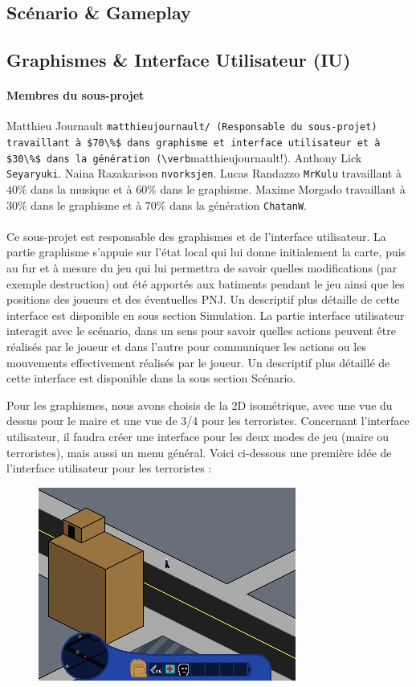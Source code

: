 \documentclass[a4paper,10pt]{article}
\begin{document}
\subsection{Scénario \& Gameplay}
\subsection{Graphismes \& Interface Utilisateur (IU)}
\paragraph{Membres du sous-projet} Matthieu Journault \verb!matthieujournault/ (Responsable du sous-projet) travaillant à $70\%$ dans graphisme et interface utilisateur et à $30\%$ dans la génération (\verb!matthieujournault!). Anthony Lick \verb!Seyaryuki!. Naina Razakarison \verb!nvorksjen!. Lucas Randazzo \verb!MrKulu! travaillant à $40\%$ dans la musique et à $60\%$ dans le graphisme. Maxime Morgado travaillant à  $30\%$ dans le graphisme et à  $70\%$ dans la génération \verb!ChatanW!.
\paragraph{} Ce sous-projet est responsable des graphismes et de l'interface utilisateur. 
La partie graphisme s'appuie sur l'état local qui lui donne initialement la carte, puis au fur et à mesure du jeu qui lui permettra de savoir quelles modifications (par exemple destruction) ont été apportés aux batiments pendant le jeu ainsi que les positions des joueurs et des éventuelles PNJ. Un descriptif plus détaille de cette interface est disponible en sous section Simulation.
La partie interface utilisateur interagit avec le scénario, dans un sens pour savoir quelles actions peuvent être réalisés par le joueur et dans l'autre pour communiquer les actions ou les mouvements effectivement réalisés par le joueur. Un descriptif plus détaillé de cette interface est disponible dans la sous section Scénario.

Pour les graphismes, nous avons choisis de la 2D isométrique, avec une vue du dessus pour le maire et une vue de 3/4 pour les terroristes. 
Concernant l'interface utilisateur, il faudra créer une interface pour les deux modes de jeu (maire ou terroristes), mais aussi un menu général. 
Voici ci-dessous une première idée de l'interface utilisateur pour les terroristes :
\begin{figure}[h]
\centering
 \includegraphics[width = 0.5\linewidth]{TS2014.png}
\end{figure}
\end{document}
